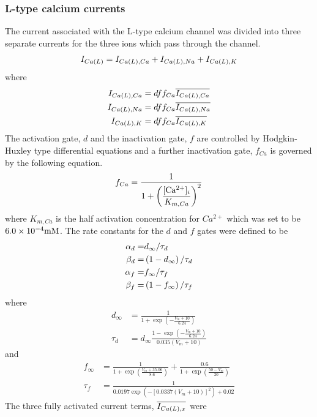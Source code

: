 \subsubsection{L-type calcium currents}
The current associated with the L-type calcium channel was divided into three
separate currents for the three ions which pass through the channel.
\begin{equation}
  I_{Ca\left( L \right)}=I_{Ca\left( L \right),Ca}+I_{Ca\left( L \right),Na}+I_{Ca\left( L \right),K}
\end{equation}
where
\begin{align}
  I_{Ca\left( L \right),Ca}&=dff_{Ca}\overline{I_{Ca\left( L \right),Ca}} \\
  I_{Ca\left( L \right),Na}&=dff_{Ca}\overline{I_{Ca\left( L \right),Na}} \\
  I_{Ca\left( L \right),K}&=dff_{Ca}\overline{I_{Ca\left( L \right),K}} 
\end{align}
The activation gate, $d$ and the inactivation gate, $f$ are controlled by
Hodgkin-Huxley type differential equations  and
a further inactivation gate, $f_{Ca}$ is governed by the following equation.
\begin{equation}
  f_{Ca}=\dfrac{1}{1+\left( \dfrac{ [\mathrm{Ca^{2+}}]_{i} }{K_{m,Ca}} \right)^2}
\end{equation}
where $K_{m,Ca}$ is the half activation concentration for $Ca^{2+}$ which was
set to be $6.0 \times 10^{-4} \mathrm{mM}$. The rate constants for the $d$ and $f$
gates were defined to be
\begin{align}
  \alpha_d=& d_{\infty}/\tau_d \\
  \beta_d=& \left( 1-d_{\infty} \right)/\tau_d\\
  \alpha_f=&f_{\infty}/\tau_f \\
  \beta_f=& \left( 1-f_{\infty} \right)/\tau_f
\end{align}
where
\begin{align}
  d_{\infty} &= \frac{1}{1 + \exp \left(-\frac{V_m +
  10}{6.24}\right)}\\ 
  \tau_d &= d_{\infty} \frac{1-\exp
  \left(-\frac{V_m+10}{6.24}\right)}{0.035 \left(V_m+10\right)}
\end{align}
and
\begin{align}
  f_{\infty} &= \frac{1}{1+\exp \left(\frac{V_m+35.06}{8.6}\right)} +
  \frac{0.6}{1+\exp \left(\frac{50-V_m}{20}\right)} \\
  \tau_f &= \frac{1}{0.0197 \exp \left( -\left[0.0337 \left( V_m + 10
  \right)\right]^2 \right) + 0.02}
\end{align}
The three fully activated current terms, $\overline{I_{Ca\left( L \right),x}}$ were
